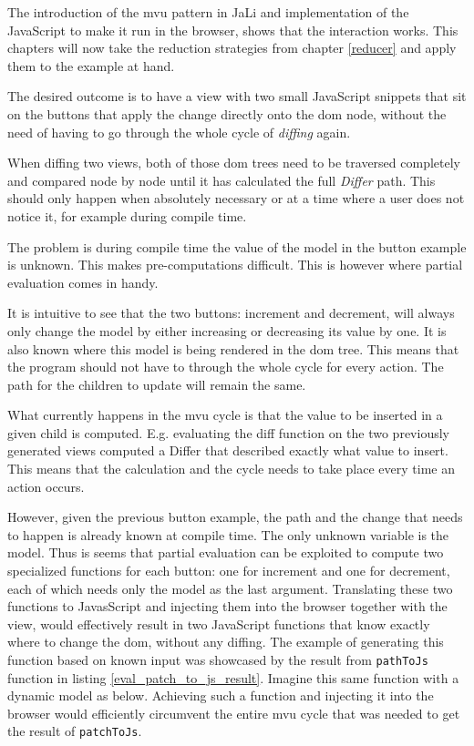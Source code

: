 The introduction of the \gls{mvu} pattern in JaLi and implementation of the JavaScript to make it run in the browser, shows that the interaction works. This chapters will now take the reduction strategies from chapter \ref{reducer} and apply them to the example at hand.

The desired outcome is to have a view with two small JavaScript snippets that sit on the buttons that apply the change directly onto the \gls{dom} node, without the need of having to go through the whole cycle of \textit{diffing} again.

When diffing two views, both of those \gls{dom} trees need to be traversed completely and compared node by node until it has calculated the full \textit{Differ} path. This should only happen when absolutely necessary or at a time where a user does not notice it, for example during compile time.

The problem is during compile time the value of the model in the button example is unknown. This makes pre-computations difficult. This is however where partial evaluation comes in handy.

It is intuitive to see that the two buttons: increment and decrement, will always only change the model by either increasing or decreasing its value by one. It is also known where this model is being rendered in the \gls{dom} tree. 
This means that the program should not have to through the whole cycle for every action. The path for the children to update will remain the same.

What currently happens in the \gls{mvu} cycle is that the value to be inserted in a given child is computed. E.g. evaluating the diff function on the two previously generated views computed a Differ that described exactly what value to insert. This means that the calculation and the cycle needs to take place every time an action occurs. 

However, given the previous button example, the path and the change that needs to happen is already known at compile time. The only unknown variable is the model. Thus is seems that partial evaluation can be exploited to compute two specialized functions for each button: one for increment and one for decrement, each of which needs only the model as the last argument. Translating these two functions to JavasScript and injecting them into the browser together with the view, would effectively result in two JavaScript functions that know exactly where to change the \gls{dom}, without any diffing. The example of generating this function based on known input was showcased by the result from \texttt{pathToJs} function in listing \ref{eval_patch_to_js_result}. Imagine this same function with a dynamic model as below. Achieving such a function and injecting it into the browser would efficiently circumvent the entire \gls{mvu} cycle that was needed to get the result of \texttt{patchToJs}.

